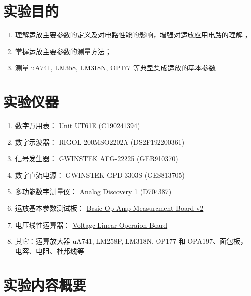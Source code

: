 \documentclass[UTF8]{article}
\begin{document}
\section{实验目的}

\begin{enumerate}
\item 理解运放主要参数的定义及对电路性能的影响，增强对运放应用电路的理解；
\item 掌握运放主要参数的测量方法；
\item 测量 uA741, LM358, LM318N, OP177 等典型集成运放的基本参数
\end{enumerate}



\section{实验仪器}

\begin{enumerate}
    \item 数字万用表： Unit UT61E (C190241394)
    \item 数字示波器： RIGOL 200MSO2202A (DS2F192200361)
    \item 信号发生器： GWINSTEK AFG-22225 (GER910370)
    \item 数字直流电源： GWINSTEK GPD-3303S (GES813705) 
    \item 多功能数字测量仪： 
    \href{https://digilent.com/reference/test-and-measurement/analog-discovery/start
    }{ %
    Analog Discovery 1
    } 
    (D704387)
    \item 运放基本参数测试板：%
    \href{https://yidingg.github.io/YiDingg/\#/ElectronicDesigns/Basic\%20Op\%20Amp\%20Measurement\%20Board\%20v2
    }{ %
    Basic Op Amp Measurement Board v2
    }
    \item 电压线性运算器：
    \href{https://yidingg.github.io/YiDingg/#/ElectronicDesigns/Voltage\%20Linear\%20Operation\%20Board
    }{ %
    Voltage Linear Operaion Board
    }
    \item 其它：运算放大器 uA741, LM258P, LM318N, OP177 和 OPA197、面包板，电容、电阻、杜邦线等
\end{enumerate}

\section{实验内容概要}
\end{document}
